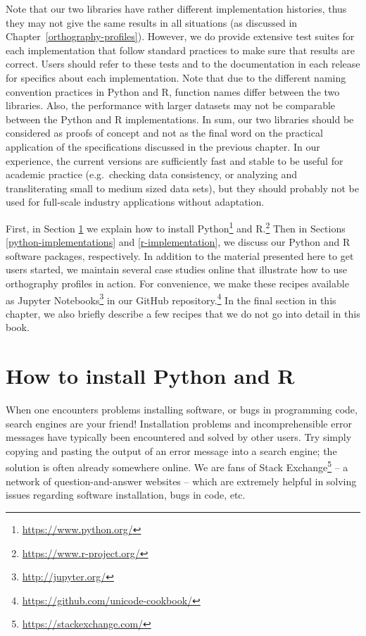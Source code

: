 \documentclass[output=book,nonflat,modfonts,
colorlinks, citecolor=brown,
		]{langsci/langscibook}\usepackage[]{graphicx}\usepackage[]{color}
\begin{document}
Note that our two libraries have rather different implementation histories, thus they may not give the same results in all situations (as discussed in Chapter~\ref{orthography-profiles}). However, we do provide extensive test suites for each implementation that follow standard practices to make sure that results are correct. Users should refer to these tests and to the documentation in each release for specifics about each implementation. Note that due to the different naming convention practices in Python and R, function names differ between the two libraries. Also, the performance with larger datasets may not be comparable between the Python and R implementations. In sum, our two libraries should be considered as proofs of concept and not as the final word on the practical application of the specifications discussed in the previous chapter. In our experience, the current versions are sufficiently fast and stable to be useful for academic practice (e.g.\ checking data consistency, or analyzing and transliterating small to medium sized data sets), but they should probably not be used for full-scale industry applications without adaptation.

First, in Section \ref{installing-python-and-r} we explain how to install Python\footnote{\url{https://www.python.org/}} and R.\footnote{\url{https://www.r-project.org/}} Then in Sections \ref{python-implementations} and \ref{r-implementation}, we discuss our Python and R software packages, respectively. In addition to the material presented here to get users started, we maintain several case studies online that illustrate how to use orthography profiles in action. For convenience, we make these recipes available as Jupyter Notebooks\footnote{\url{http://jupyter.org/}} in our GitHub repository.\footnote{\url{https://github.com/unicode-cookbook/}} In the final section in this chapter, we also briefly describe a few recipes that we do not go into detail in this book.

\section{How to install Python and R}
\label{installing-python-and-r}
When one encounters problems installing software, or bugs in programming code, search engines are your friend! Installation problems and incomprehensible error messages have typically been encountered and solved by other users. Try simply copying and pasting the output of an error message into a search engine; the solution is often already somewhere online. We are fans of Stack Exchange\footnote{\url{https://stackexchange.com/}} -- a network of question-and-answer websites -- which are extremely helpful in solving issues regarding software installation, bugs in code, etc.
\end{document}
